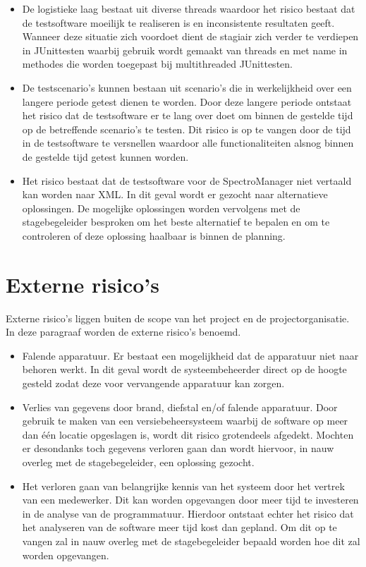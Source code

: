 \begin{itemize}
\item De logistieke laag bestaat uit diverse threads waardoor het risico bestaat dat de testsoftware moeilijk te realiseren is en inconsistente resultaten geeft. Wanneer deze situatie zich voordoet dient de stagiair zich verder te verdiepen in JUnittesten waarbij gebruik wordt gemaakt van threads en met name in methodes die worden toegepast bij multithreaded JUnittesten.
\item De testscenario's kunnen bestaan uit scenario's die in werkelijkheid over een langere periode getest dienen te worden. Door deze langere periode ontstaat het risico dat de testsoftware er te lang over doet om binnen de gestelde tijd op de betreffende scenario's te testen. Dit risico is op te vangen door de tijd in de testsoftware te versnellen waardoor alle functionaliteiten alsnog binnen de gestelde tijd getest kunnen worden.
\item Het risico bestaat dat de testsoftware voor de SpectroManager niet vertaald kan worden naar XML. In dit geval wordt er gezocht naar alternatieve oplossingen. De mogelijke oplossingen worden vervolgens met de stagebegeleider besproken om het beste alternatief te bepalen en om te controleren of deze oplossing haalbaar is binnen de planning.
\end{itemize}

\section{Externe risico's}
Externe risico's liggen buiten de scope van het project en de projectorganisatie. In deze paragraaf worden de externe risico's benoemd.\par
\begin{itemize}
\item Falende apparatuur. Er bestaat een mogelijkheid dat de apparatuur niet naar behoren werkt. In dit geval wordt de systeembeheerder direct op de hoogte gesteld zodat deze voor vervangende apparatuur kan zorgen.
\item Verlies van gegevens door brand, diefstal en/of falende apparatuur. Door gebruik te maken van een versiebeheersysteem waarbij de software op meer dan één locatie opgeslagen is, wordt dit risico grotendeels afgedekt. Mochten er desondanks toch gegevens verloren gaan dan wordt hiervoor, in nauw overleg met de stagebegeleider, een oplossing gezocht.
\item Het verloren gaan van belangrijke kennis van het systeem door het vertrek van een medewerker. Dit kan worden opgevangen door meer tijd te investeren in de analyse van de programmatuur. Hierdoor ontstaat echter het risico dat het analyseren van de software meer tijd kost dan gepland. Om dit op te vangen zal in nauw overleg met de stagebegeleider bepaald worden hoe dit zal worden opgevangen.
\end{itemize}
